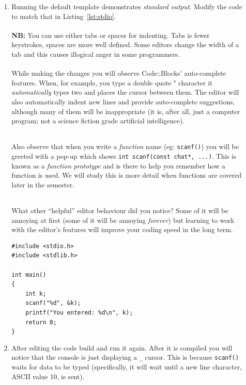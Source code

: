 \documentclass{lab}
\begin{document}
\pagebreak
\begin{task}{}{}

\begin{enumerate}

\item Running the default template demonstrates \textit{standard output}. Modify the code to match that in Listing~\ref{lst:stdio}.
\\ \\
\textbf{NB:} You can use either tabs or spaces for indenting. Tabs is fewer keystrokes, spaces are more well defined. Some editors change the width of a tab and this causes illogical anger in some programmers.
\\ \\
While making the changes you will observe Code::Blocks' auto-complete features. When, for example, you type a double quote " character it \textit{automatically} types two and places the cursor between them. The editor will also automatically indent new lines and provide auto-complete suggestions, although many of them will be inappropriate (it is, after all, just a computer program; not a science fiction grade artificial intelligence).

~\\
Also observe that when you write a \textit{function} name (eg: \texttt{scanf()}) you will be greeted with a pop-up which shows \texttt{int scanf(const chat*, ...)}. This is known as a \textit{function prototype} and is there to help you remember how a function is used. We will study this is more detail when functions are covered later in the semester.

~\\
What other ``helpful'' editor behaviour did you notice? Some of it will be annoying at first (some of it will be annoying \textit{forever}) but learning to work with the editor's features will improve your coding speed in the long term.

\begin{lstlisting}[style=CStyle,caption=A basic C program which demonstrates input and output.,label=lst:stdio]
#include <stdio.h>
#include <stdlib.h>

int main()
{
	int k;
	scanf("%d", &k);
	printf("You entered: %d\n", k);
	return 0;
}
\end{lstlisting}

\item After editing the code build and run it again. After it is compiled you will notice that the console is just displaying a \texttt{\_} cursor. This is because \texttt{scanf()} waits for data to be typed (specifically, it will wait until a new line character, ASCII value 10, is sent).


\end{enumerate}
\end{task}
\end{document}

